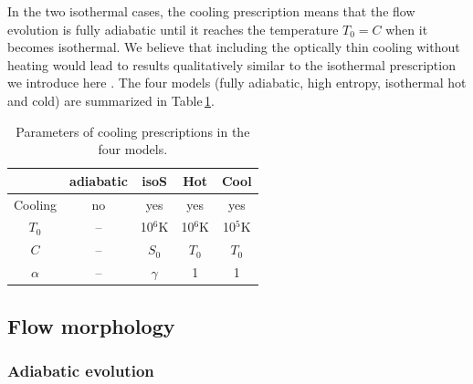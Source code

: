 \documentclass{aa}
\begin{document}
In the two isothermal cases, the cooling prescription means that the flow evolution is fully adiabatic until it reaches the temperature $T_0=C$ when it becomes isothermal. We believe that including the optically thin cooling without heating would lead to results qualitatively similar to the isothermal prescription we introduce here \citep[as noticed by][]{Saladino2018} . The four models (fully adiabatic, high entropy, isothermal hot and cold) are summarized in Table\,\ref{tab:cool}.

\begin{table}
\centering
\caption{Parameters of cooling prescriptions in the four models.}
\label{tab:cool}
\begin{tabularx}{\linewidth}{c|c|c|c|c}
   & adiabatic & isoS & Hot & Cool\\
  \hline
  Cooling & no & yes & yes & yes \\  
  $T_0$ & -- & 10$^6$K & 10$^6$K & 10$^5$K \\
  $C$ & -- & $S_0$ & $T_0$ & $T_0$ \\
  $\alpha$ & -- & $\gamma$ & 1 & 1 \\
\end{tabularx}
\end{table}

\subsection{Flow morphology}
\label{sec:morph}

\subsubsection{Adiabatic evolution}
\label{sec:cool_F}
\end{document}
